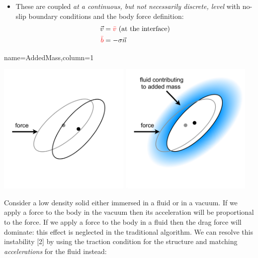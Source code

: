 \documentclass[
paperwidth=48in,paperheight=36in,
fontscale=0.4
]{baposter}
\begin{document}
\begin{poster}
{\begin{itemize}
    \item These are coupled \emph{at a continuous, but not necessarily discrete,
          level} with no-slip boundary conditions and the body force definition:
          \begin{align*}
              \vec{v}   &= {\color{red} \bar{v}} \text{ (at the interface)}               \\
              {\color{red} \bar{b}} &= -\sigma \vec{n}
          \end{align*}
\end{itemize}
}
          {name=AddedMass,column=1}
{
\begin{center}
    \includegraphics[width=2.5in]{left.png}
    \hspace{0.5in}
    \includegraphics[width=2.5in]{right.png}
\end{center}

\vspace{-0.5in}

Consider a low density solid either immersed in a fluid or in a vacuum. If we
apply a force to the body in the vacuum then its acceleration will be
proportional to the force. If we apply a force to the body in a fluid then the
drag force will dominate: this effect is neglected in the traditional algorithm.
We can resolve this instability [2] by using the traction condition for the
structure and matching \emph{accelerations} for the fluid instead:

}
\end{poster}
\end{document}
